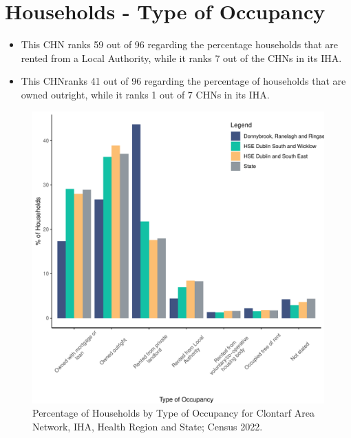 \documentclass{article}
\begin{document}
\section{Households - Type of Occupancy}\label{sect:Households}
\begin{itemize}
\item This CHN ranks  59 out of 96 regarding the percentage households that are rented from a Local Authority, while it ranks  7 out of the CHNs in its IHA. 
\item This CHNranks  41 out of 96 regarding the percentage of households that are owned outright, while it ranks   1 out of 7 CHNs in its IHA.
\end{itemize}
\begin{figure}[H]
	\centering
	\includegraphics[width = 140mm]{../figures/HouseholdsED.pdf}
	\caption{Percentage of Households by Type of Occupancy for Clontarf Area Network, IHA, Health Region and State; Census 2022.}
	\label{fig:vbnv}
	\end{figure}
\end{document}
